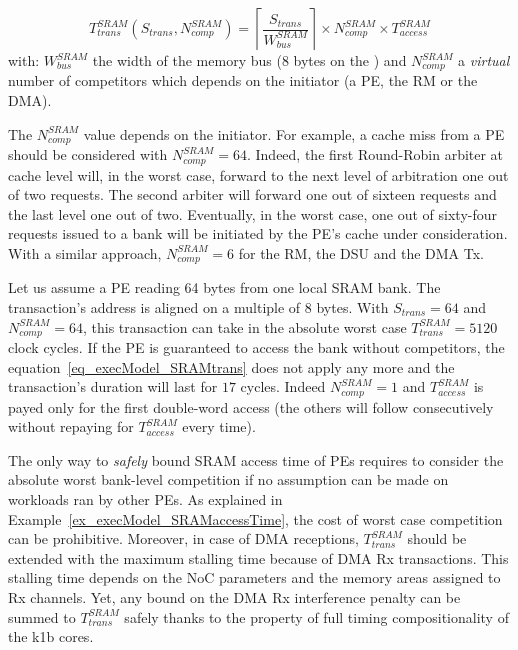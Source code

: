 \documentclass[main.tex]{subfiles}
\begin{document}
\begin{equation}
    \label{eq_execModel_SRAMtrans}
    T_{trans}^{SRAM} ( S_{trans} , N_{comp}^{SRAM} ) = \left\lceil \dfrac{S_{trans}}{W_{bus}^{SRAM}} \right\rceil \times N_{comp}^{SRAM} \times T_{access}^{SRAM}
\end{equation}
with: $W_{bus}^{SRAM}$ the width of the memory bus (8 bytes on the \mppalong) and $N_{comp}^{SRAM}$ a \emph{virtual} number of competitors which depends on the initiator (a PE, the RM or the DMA).

The $N_{comp}^{SRAM}$ value depends on the initiator. For example, a cache miss from a PE should be considered with $N_{comp}^{SRAM} = 64$. Indeed, the first Round-Robin arbiter at cache level will, in the worst case, forward to the next level of arbitration one out of two requests. The second arbiter will forward one out of sixteen requests and the last level one out of two. Eventually, in the worst case, one out of sixty-four requests issued to a bank will be initiated by the PE's cache under consideration. With a similar approach, $N_{comp}^{SRAM} = 6$ for the RM, the DSU and the DMA Tx.

\begin{example}
    \label{ex_execModel_SRAMaccessTime}
    Let us assume a PE reading 64 bytes from one local SRAM bank. The transaction's address is aligned on a multiple of 8 bytes. With $S_{trans} = 64$ and $N_{comp}^{SRAM} = 64$, this transaction can take in the absolute worst case $T_{trans}^{SRAM} = 5120$ clock cycles. If the PE is guaranteed to access the bank without competitors, the equation~\ref{eq_execModel_SRAMtrans} does not apply any more and the transaction's duration will last for $17$ cycles. Indeed $N_{comp}^{SRAM}=1$ and $T_{access}^{SRAM}$ is payed only for the first double-word access (the others will follow consecutively without repaying for $T_{access}^{SRAM}$ every time).
\end{example}

The only way to \emph{safely} bound SRAM access time of PEs requires to consider the absolute worst bank-level competition if no assumption can be made on workloads ran by other PEs. As explained in Example~\ref{ex_execModel_SRAMaccessTime}, the cost of worst case competition can be prohibitive. 
Moreover, in case of DMA receptions, $T_{trans}^{SRAM}$ should be extended with the maximum stalling time because of DMA Rx transactions. This stalling time depends on the NoC parameters and the memory areas assigned to Rx channels. Yet, any bound on the DMA Rx interference penalty can be summed to $T_{trans}^{SRAM}$ safely thanks to the property of full timing compositionality of the k1b cores.
\end{document}
